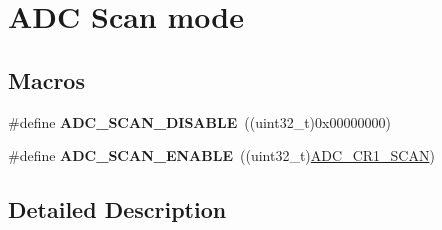\hypertarget{group___a_d_c___scan__mode}{\section{A\-D\-C Scan mode}
\label{group___a_d_c___scan__mode}
}
\subsection*{Macros}
\begin{DoxyCompactItemize}
\item 
\hypertarget{group___a_d_c___scan__mode_ga6e269121b26e999155863ce52c522883}{\#define {\bfseries A\-D\-C\-\_\-\-S\-C\-A\-N\-\_\-\-D\-I\-S\-A\-B\-L\-E}~((uint32\-\_\-t)0x00000000)}\label{group___a_d_c___scan__mode_ga6e269121b26e999155863ce52c522883}

\item 
\hypertarget{group___a_d_c___scan__mode_ga1e109b8619961829ff2bc368c1725382}{\#define {\bfseries A\-D\-C\-\_\-\-S\-C\-A\-N\-\_\-\-E\-N\-A\-B\-L\-E}~((uint32\-\_\-t)\hyperlink{group___peripheral___registers___bits___definition_gaaeab75ece0c73dd97e8f21911ed22d06}{A\-D\-C\-\_\-\-C\-R1\-\_\-\-S\-C\-A\-N})}\label{group___a_d_c___scan__mode_ga1e109b8619961829ff2bc368c1725382}

\end{DoxyCompactItemize}


\subsection{Detailed Description}
